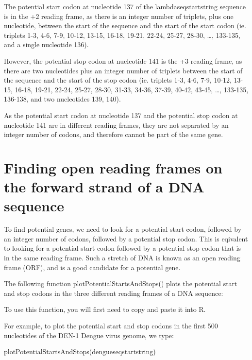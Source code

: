 \documentclass[
]{book}
\newenvironment{Shaded}{\begin{snugshade}}{\end{snugshade}}
\newcommand{\FunctionTok}[1]{\textcolor[rgb]{0.00,0.00,0.00}{#1}}
\newcommand{\NormalTok}[1]{#1}
\begin{document}
The potential start codon at nucleotide 137 of the lambdaseqstartstring sequence is in the +2 reading frame, as there is an integer number of triplets, plus one nucleotide, between the start of the sequence and the start of the start codon (ie. triplets 1-3, 4-6, 7-9, 10-12, 13-15, 16-18, 19-21, 22-24, 25-27, 28-30, \ldots, 133-135, and a single nucleotide 136).

However, the potential stop codon at nucleotide 141 is the +3 reading frame, as there are two nucleotides plus an integer number of triplets between the start of the sequence and the start of the stop codon (ie. triplets 1-3, 4-6, 7-9, 10-12, 13-15, 16-18, 19-21, 22-24, 25-27, 28-30, 31-33, 34-36, 37-39, 40-42, 43-45, \ldots, 133-135, 136-138, and two nucleotides 139, 140).

As the potential start codon at nucleotide 137 and the potential stop codon at nucleotide 141 are in different reading frames, they are not separated by an integer number of codons, and therefore cannot be part of the same gene.

\hypertarget{finding-open-reading-frames-on-the-forward-strand-of-a-dna-sequence}{%
\section{Finding open reading frames on the forward strand of a DNA sequence}\label{finding-open-reading-frames-on-the-forward-strand-of-a-dna-sequence}}

To find potential genes, we need to look for a potential start codon, followed by an integer number of codons, followed by a potential stop codon. This is eqivalent to looking for a potential start codon followed by a potential stop codon that is in the same reading frame. Such a stretch of DNA is known as an open reading frame (ORF), and is a good candidate for a potential gene.

The following function plotPotentialStartsAndStops() plots the potential start and stop codons in the three different reading frames of a DNA sequence:

To use this function, you will first need to copy and paste it into R.

For example, to plot the potential start and stop codons in the first 500 nucleotides of the DEN-1 Dengue virus genome, we type:

\begin{Shaded}
\begin{Highlighting}[]
\FunctionTok{plotPotentialStartsAndStops}\NormalTok{(dengueseqstartstring)}
\end{Highlighting}
\end{Shaded}
\end{document}
